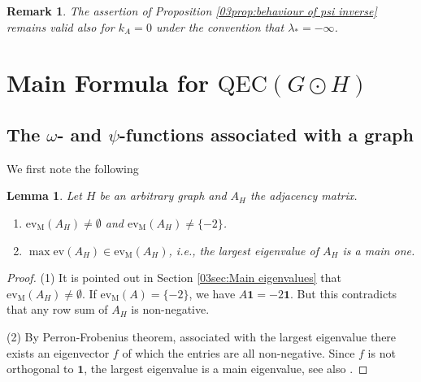 \documentclass[12pt,a4paper]{article}
\newtheorem{lemma}[theorem]{Lemma}
\newtheorem{remark}[theorem]{Remark}
\newcommand{\1}{{\bm 1}}
\numberwithin{equation}{section}
\begin{document}
\begin{remark}
\normalfont
The assertion of Proposition \ref{03prop:behaviour of psi inverse}
remains valid also for $k_A=0$ under the convention that
$\lambda_*=-\infty$.
\end{remark}




\section{Main Formula for $\mathrm{QEC}(G\odot H)$}

\subsection{The $\omega$- and $\psi$-functions associated with a graph}

We first note the following

\begin{lemma}\label{04lem:main eigen is only -2}
Let $H$ be an arbitrary graph and $A_H$ the adjacency matrix.
\begin{enumerate}
\item[\upshape (1)] $\mathrm{ev}_{\mathrm{M}}(A_H)\neq\emptyset$
and $\mathrm{ev}_{\mathrm{M}}(A_H)\neq\{-2\}$.
\item[\upshape (2)] 
$\max\mathrm{ev}(A_H)\in \mathrm{ev}_{\mathrm{M}}(A_H)$,
i.e., the largest eigenvalue of $A_H$ is a main one.
\end{enumerate}
\end{lemma}

\begin{proof}
(1) It is pointed out in Section \ref{03sec:Main eigenvalues}
that $\mathrm{ev}_{\mathrm{M}}(A_H)\neq\emptyset$.
If $\mathrm{ev}_{\mathrm{M}}(A)=\{-2\}$, 
we have $A\mathbf{1}=-2\mathbf{1}$.
But this contradicts that any row sum of $A_H$ is non-negative.

(2) By Perron-Frobenius theorem,
associated with the largest eigenvalue there exists
an eigenvector $f$ of which the entries are all non-negative.
Since $f$ is not orthogonal to $\bm{1}$,
the largest eigenvalue is a main eigenvalue,
see also \cite{Cvetkovic1978,Cvetkovic-Rowlinson-Simic2010}.
\end{proof}
\end{document}
